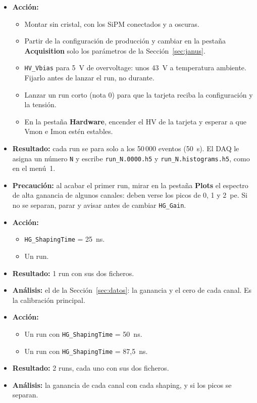 \documentclass[11pt,a4paper]{article}
\begin{document}
\begin{itemize}
\item {\bf Acción:}
  \begin{itemize}
  \item Montar sin cristal, con los SiPM conectados y a oscuras.
  \item Partir de la configuración de producción y cambiar en la pestaña
    {\bf Acquisition} solo los parámetros de la Sección~\ref{sec:janus}.
  \item \texttt{HV\_Vbias} para 5~V de overvoltage: unos 43~V a temperatura
    ambiente. Fijarlo antes de lanzar el run, no durante.
  \item Lanzar un run corto (nota 0) para que la tarjeta reciba la
    configuración y la tensión.
  \item En la pestaña {\bf Hardware}, encender el HV de la tarjeta y esperar
    a que Vmon e Imon estén estables.
  \end{itemize}
\item {\bf Resultado:} cada run se para solo a los 50\,000 eventos (50~s).
  El DAQ le asigna un número \texttt{N} y escribe \texttt{run\_N.0000.h5} y
  \texttt{run\_N.histograms.h5}, como en el menú~1.
\item {\bf Precaución:} al acabar el primer run, mirar en la pestaña
  {\bf Plots} el espectro de alta ganancia de algunos canales: deben verse
  los picos de 0, 1 y 2~pe. Si no se separan, parar y avisar antes de
  cambiar \texttt{HG\_Gain}.
\end{itemize}

\begin{itemize}
\item {\bf Acción:}
  \begin{itemize}
  \item \texttt{HG\_ShapingTime} = 25~ns.
  \item Un run.
  \end{itemize}
\item {\bf Resultado:} 1 run con sus dos ficheros.
\item {\bf Análisis:} el de la Sección~\ref{sec:datos}: la ganancia y el
  cero de cada canal. Es la calibración principal.
\end{itemize}

\begin{itemize}
\item {\bf Acción:}
  \begin{itemize}
  \item Un run con \texttt{HG\_ShapingTime} = 50~ns.
  \item Un run con \texttt{HG\_ShapingTime} = 87,5~ns.
  \end{itemize}
\item {\bf Resultado:} 2 runs, cada uno con sus dos ficheros.
\item {\bf Análisis:} la ganancia de cada canal con cada shaping, y si los
  picos se separan.
\end{itemize}
\end{document}
